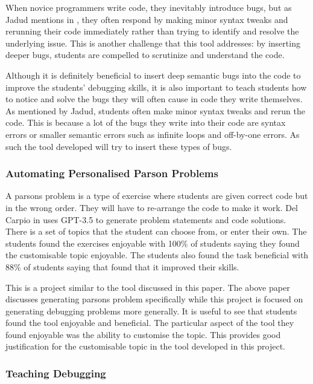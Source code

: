 \documentclass[12pt]{extarticle}
\begin{document}
When novice programmers write code, they inevitably introduce bugs, but as Jadud mentions in \cite{jadud2006}, they often respond by making minor syntax tweaks and rerunning their code immediately rather than trying to identify and resolve the underlying issue. This is another challenge that this tool addresses: by inserting deeper bugs, students are compelled to scrutinize and understand the code.

Although it is definitely beneficial to insert deep semantic bugs into the code to improve the students' debugging skills, it is also important to teach students how to notice and solve the bugs they will often cause in code they write themselves. As mentioned by Jadud, students often make minor syntax tweaks and rerun the code. This is because a lot of the bugs they write into their code are syntax errors or smaller semantic errors such as infinite loops and off-by-one errors. As such the tool developed will try to insert these types of bugs.

\subsubsection{Automating Personalised Parson Problems}

A parsons problem is a type of exercise where students are given correct code but in the wrong order. They will have to re-arrange the code to make it work. Del Carpio in \cite{delCarpio2024} uses GPT-3.5 to generate problem statements and code solutions. There is a set of topics that the student can choose from, or enter their own. The students found the exercises enjoyable with 100\% of students saying they found the customisable topic enjoyable. The students also found the task beneficial with 88\% of students saying that found that it improved their skills.

This is a project similar to the tool discussed in this paper. The above paper discusses generating parsons problem specifically while this project is focused on generating debugging problems more generally. It is useful to see that students found the tool enjoyable and beneficial. The particular aspect of the tool they found enjoyable was the ability to customise the topic. This provides good justification for the customisable topic in the tool developed in this project.

\subsubsection{Teaching Debugging}
\end{document}
